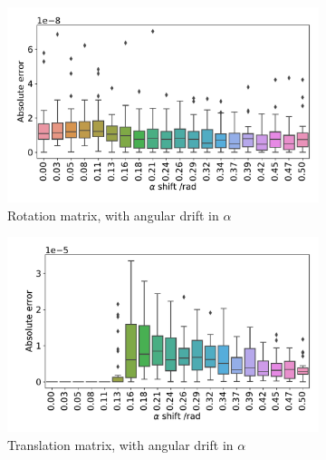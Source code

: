\documentclass{osa-article}
\begin{document}
\begin{figure}
  \centering
  \begin{subfigure}[t]{0.5\linewidth}
    \captionsetup{width=0.8\linewidth}
    \centering
    \includegraphics[width=\linewidth]{./figures/results/helix/decompose/improved/10082020_bead_simulation_alpha_ROT_err}
    \caption{Rotation matrix, with angular drift in \(\alpha \)}\label{fig:pc_sum_rot_alpha}
  \end{subfigure}\hfill
  \begin{subfigure}[t]{0.5\linewidth}
    \captionsetup{width=0.8\linewidth}
    \centering
    \includegraphics[width=\linewidth]{./figures/results/helix/decompose/improved/10082020_bead_simulation_alpha_TRANS_err}
    \caption{Translation matrix, with angular drift in \(\alpha \)}\label{fig:pc_sum_trans_alpha}
  \end{subfigure}
  \par\bigskip
  \begin{subfigure}[t]{0.5\linewidth}

\end{subfigure}
\end{figure}
\end{document}
